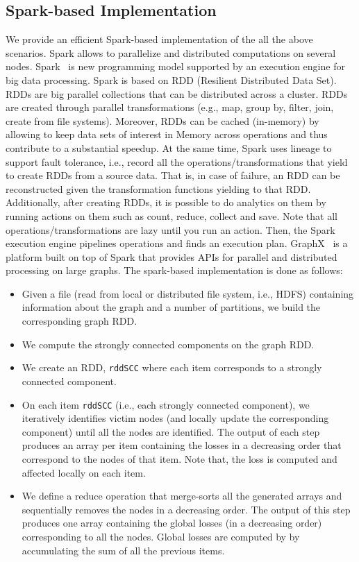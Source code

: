 \subsection{Spark-based Implementation}
We provide an efficient Spark-based implementation of the all the above scenarios. Spark allows to parallelize and distributed computations on several nodes. 
%
Spark~\cite{spark} is new programming model supported by an execution engine for big data processing. Spark is based on RDD (Resilient Distributed Data Set). RDDs are big parallel collections that can be distributed across a cluster. RDDs are created through parallel transformations (e.g., map, group by, filter, join, create from file systems). Moreover, RDDs can be cached (in-memory) by allowing to keep data sets of interest in Memory across operations and thus contribute to a substantial speedup. At the same time, Spark uses lineage to support fault tolerance, i.e., record all the operations/transformations that yield to create RDDs from a source data. That is, in case of failure, an RDD can be reconstructed given the transformation functions yielding to that RDD. Additionally, after creating RDDs, it is possible to do analytics on them by running actions on them such as count, reduce, collect and save. Note that all operations/transformations are lazy until you run an action. Then, the Spark execution engine pipelines operations and finds an execution plan. GraphX~\cite{graphx} is a platform built on top of Spark that provides APIs for parallel and distributed processing on large graphs. 
%
The spark-based implementation is done as follows:
\begin{itemize}
\item Given a file (read from local or distributed file system, i.e., HDFS) containing information about the graph and a number of partitions, we build the corresponding graph RDD. 
\item We compute the strongly connected components on the graph RDD. 
\item We create an RDD, \texttt{rddSCC} where each item corresponds to a strongly connected component. 
\item On each item \texttt{rddSCC} (i.e., each strongly connected component), we iteratively identifies victim nodes (and locally update the corresponding component) until all the nodes are identified. The output of each step produces an array per item containing the losses in a decreasing order that correspond to the nodes of that item. Note that, the loss is computed and affected locally on each item. 
\item We define a reduce operation that merge-sorts all the generated arrays and sequentially removes the nodes in a decreasing order. The output of this step produces one array containing the global losses (in a decreasing order) corresponding to all the nodes. Global losses are computed by by accumulating the sum of all the previous items. 
\end{itemize}




